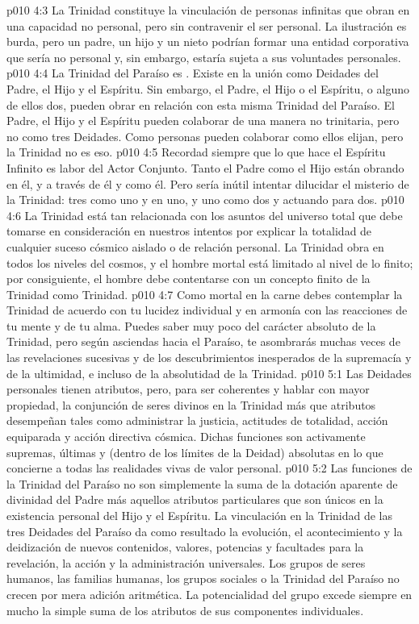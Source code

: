 \vs p010 4:3 La Trinidad constituye la vinculación de personas infinitas que obran en una capacidad no personal, pero sin contravenir el ser personal. La ilustración es burda, pero un padre, un hijo y un nieto podrían formar una entidad corporativa que sería no personal y, sin embargo, estaría sujeta a sus voluntades personales.
\vs p010 4:4 La Trinidad del Paraíso es . Existe en la unión como Deidades del Padre, el Hijo y el Espíritu. Sin embargo, el Padre, el Hijo o el Espíritu, o alguno de ellos dos, pueden obrar en relación con esta misma Trinidad del Paraíso. El Padre, el Hijo y el Espíritu pueden colaborar de una manera no trinitaria, pero no como tres Deidades. Como personas pueden colaborar como ellos elijan, pero la Trinidad no es eso.
\vs p010 4:5 \pc Recordad siempre que lo que hace el Espíritu Infinito es labor del Actor Conjunto. Tanto el Padre como el Hijo están obrando en él, y a través de él y como él. Pero sería inútil intentar dilucidar el misterio de la Trinidad: tres como uno y en uno, y uno como dos y actuando para dos.
\vs p010 4:6 \pc La Trinidad está tan relacionada con los asuntos del universo total que debe tomarse en consideración en nuestros intentos por explicar la totalidad de cualquier suceso cósmico aislado o de relación personal. La Trinidad obra en todos los niveles del cosmos, y el hombre mortal está limitado al nivel de lo finito; por consiguiente, el hombre debe contentarse con un concepto finito de la Trinidad como Trinidad.
\vs p010 4:7 Como mortal en la carne debes contemplar la Trinidad de acuerdo con tu lucidez individual y en armonía con las reacciones de tu mente y de tu alma. Puedes saber muy poco del carácter absoluto de la Trinidad, pero según asciendas hacia el Paraíso, te asombrarás muchas veces de las revelaciones sucesivas y de los descubrimientos inesperados de la supremacía y de la ultimidad, e incluso de la absolutidad de la Trinidad.
\vs p010 5:1 Las Deidades personales tienen atributos, pero, para ser coherentes y hablar con mayor propiedad, la conjunción de seres divinos en la Trinidad más que atributos desempeñan  tales como administrar la justicia, actitudes de totalidad, acción equiparada y acción directiva cósmica. Dichas funciones son activamente supremas, últimas y (dentro de los límites de la Deidad) absolutas en lo que concierne a todas las realidades vivas de valor personal.
\vs p010 5:2 Las funciones de la Trinidad del Paraíso no son simplemente la suma de la dotación aparente de divinidad del Padre más aquellos atributos particulares que son únicos en la existencia personal del Hijo y el Espíritu. La vinculación en la Trinidad de las tres Deidades del Paraíso da como resultado la evolución, el acontecimiento y la deidización de nuevos contenidos, valores, potencias y facultades para la revelación, la acción y la administración universales. Los grupos de seres humanos, las familias humanas, los grupos sociales o la Trinidad del Paraíso no crecen por mera adición aritmética. La potencialidad del grupo excede siempre en mucho la simple suma de los atributos de sus componentes individuales.
